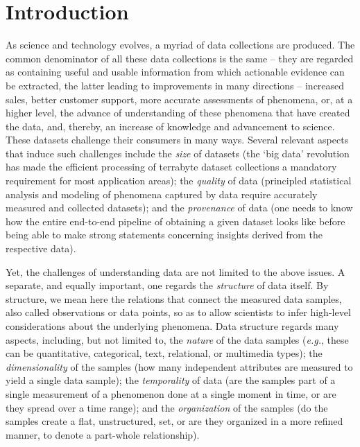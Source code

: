 \chapter{Introduction}
\label{ch:intro}
%
As science and technology evolves, a myriad of data collections are produced. The common denominator of all these data collections is the same -- they are regarded as containing useful and usable information from which actionable evidence can be extracted, the latter leading to improvements in many directions -- increased sales, better customer support, more accurate assessments of phenomena, or, at a higher level, the advance of understanding of these phenomena that have created the data, and, thereby, an increase of knowledge and advancement to science. These datasets challenge their consumers in many ways. Several relevant aspects that induce such challenges include the \emph{size} of datasets (the `big data' revolution has made the efficient processing of terrabyte dataset collections a mandatory requirement for most application areas); the \emph{quality} of data (principled statistical analysis and modeling of phenomena captured by data require accurately measured and collected datasets); and the \emph{provenance} of data (one needs to know how the entire end-to-end pipeline of obtaining a given dataset looks like before being able to make strong statements concerning insights derived from the respective data).

Yet, the challenges of understanding data are not limited to the above issues. A separate, and equally important, one regards the \emph{structure} of data itself. By structure, we mean here the relations that connect the measured data samples, also called observations or data points, so as to allow scientists to infer high-level considerations about the underlying phenomena. Data structure regards many aspects, including, but not limited to, the \emph{nature} of the data samples (\emph{e.g.}, these can be quantitative, categorical, text, relational, or multimedia types); the \emph{dimensionality} of the samples (how many independent attributes are measured to yield a single data sample); the \emph{temporality} of data (are the samples part of a single measurement of a phenomenon done at a single moment in time, or are they spread over a time range); and the \emph{organization} of the samples (do the samples create a flat, unstructured, set, or are they organized in a more refined manner, to denote a part-whole relationship).

